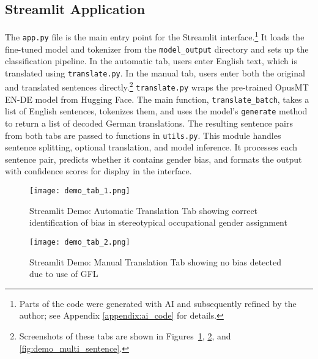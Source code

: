     \subsection{Streamlit Application}
        The \texttt{app.py} file is the main entry point for the Streamlit interface.\footnote{Parts of the code were generated with AI and subsequently refined by the author; see Appendix \ref{appendix:ai_code} for details.}
        It loads the fine-tuned model and tokenizer from the \texttt{model\_output} directory and sets up the classification pipeline. In the automatic tab, users enter English text, which is translated using \texttt{translate.py}. In the manual tab, users enter both the original and translated sentences directly.\footnote{Screenshots of these tabs are shown in Figures~\ref{fig:demo_tab_1}, \ref{fig:demo_tab_2}, and \ref{fig:demo_multi_sentence}.} \texttt{translate.py} wraps the pre-trained OpusMT EN-DE model from Hugging Face. The main function, \texttt{translate\_batch}, takes a list of English sentences, tokenizes them, and uses the model's \texttt{generate} method to return a list of decoded German translations. The resulting sentence pairs from both tabs are passed to functions in \texttt{utils.py}. This module handles sentence splitting, optional translation, and model inference. It processes each sentence pair, predicts whether it contains gender bias, and formats the output with confidence scores for display in the interface.

        \vspace{0.8em}
        \begin{figure}[H]
            \centering
            \texttt{[image: demo\_tab\_1.png]}
            \caption[Streamlit Demo: Automatic Translation Tab]{Streamlit Demo: Automatic Translation Tab showing correct identification of bias in stereotypical occupational gender assignment}
            \label{fig:demo_tab_1}
        \end{figure}
        \vspace{0.8em}

        \begin{figure}[H]
            \centering
            \texttt{[image: demo\_tab\_2.png]}
            \caption[Streamlit Demo: Manual Translation Tab]{Streamlit Demo: Manual Translation Tab showing no bias detected due to use of GFL}
            \label{fig:demo_tab_2}
        \end{figure}
        \vspace{0.8em}


